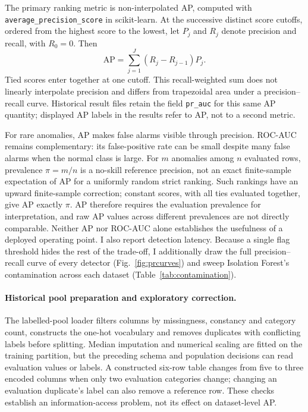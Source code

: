 \documentclass[conference]{IEEEtran}
\begin{document}
The primary ranking metric is non-interpolated AP, computed with
\texttt{average\_precision\_score} in scikit-learn. At the successive distinct
score cutoffs, ordered from the highest score to the lowest, let $P_j$ and
$R_j$ denote precision and recall, with $R_0=0$. Then
\begin{equation}
\label{eq:average-precision}
\mathrm{AP}=\sum_{j=1}^{J}(R_j-R_{j-1})P_j.
\end{equation}
Tied scores enter together at one cutoff. This recall-weighted sum does not
linearly interpolate precision and differs from trapezoidal area under a
precision--recall curve. Historical result files retain the field
\texttt{pr\_auc} for this same AP quantity; displayed AP labels in the
results refer to AP, not to a second metric.

For rare anomalies, AP makes false alarms visible through precision.
ROC-AUC remains complementary: its false-positive rate can be small despite
many false alarms when the normal class is large. For $m$ anomalies among
$n$ evaluated rows, prevalence $\pi=m/n$ is a no-skill reference precision,
not an exact finite-sample expectation of AP for a uniformly random strict
ranking. Such rankings have an upward finite-sample correction; constant
scores, with all ties evaluated together, give AP exactly $\pi$. AP therefore
requires the evaluation prevalence for interpretation, and raw AP values
across different prevalences are not directly comparable. Neither AP nor
ROC-AUC alone establishes the usefulness of a deployed operating point.
I also report detection latency. Because a single flag threshold hides the
rest of the trade-off, I additionally draw the full precision--recall curve
of every detector (Fig.~\ref{fig:prcurves}) and sweep Isolation Forest's
contamination across each dataset (Table~\ref{tab:contamination}).

\paragraph{Historical pool preparation and exploratory correction.}
The labelled-pool loader filters columns by missingness, constancy and category
count, constructs the one-hot vocabulary and removes duplicates with conflicting
labels before splitting. Median imputation and numerical scaling are fitted on
the training partition, but the preceding schema and population decisions can
read evaluation values or labels. A constructed six-row table changes from five
to three encoded columns when only two evaluation categories change; changing
an evaluation duplicate's label can also remove a reference row. These checks
establish an information-access problem, not its effect on dataset-level AP.
\end{document}

